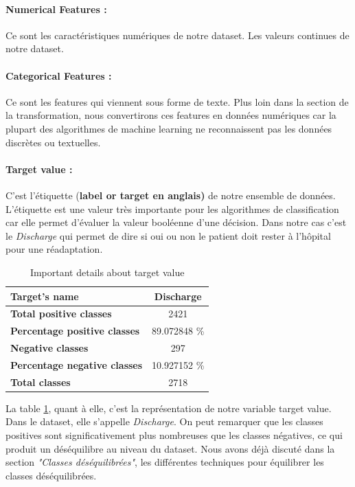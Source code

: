 \documentclass[12pt, french]{report}
\begin{document}
\paragraph*{ Numerical Features :} Ce sont les caractéristiques numériques de notre dataset. Les valeurs continues de notre dataset.

\paragraph*{ Categorical Features :} Ce sont les features qui viennent sous forme de texte. Plus loin dans la section de la transformation, nous convertirons ces features en données numériques car la plupart des algorithmes de machine learning ne reconnaissent pas les données discrètes ou textuelles.

\paragraph*{ Target value :} C'est l'étiquette (\textbf{label or target en anglais)} de notre ensemble de données. L'étiquette est une valeur très importante pour les algorithmes de classification car elle permet d'évaluer la valeur booléenne d'une décision. Dans notre cas c'est le \textit{Discharge} qui permet de dire si oui ou non le patient doit rester à l'hôpital pour une réadaptation. \\

\begin{table}[h]
\centering
\begin{tabular}{| l | c |}
\hline
\textbf{Target's name} & Discharge \\
\hline
\textbf{Total positive classes} & 2421 \\
\hline
\textbf{Percentage positive classes} & 89.072848 \% \\
\hline
\textbf{Negative classes} & 297 \\
\hline
\textbf{Percentage negative classes} & 10.927152 \% \\
\hline
\textbf{Total classes} & 2718 \\

\hline
\end{tabular}
\caption{Important details about target value}
\label{tab:target}
\end{table}

La table \ref{tab:target}, quant à elle, c'est la représentation de notre variable target value. Dans le dataset, elle s'appelle \textit{Discharge}. On peut remarquer que les classes positives sont significativement plus nombreuses que les classes négatives, ce qui produit un déséquilibre au niveau du dataset. Nous avons déjà discuté dans la section\textit{ "Classes déséquilibrées"}, les différentes techniques pour équilibrer les classes déséquilibrées.
\end{document}
